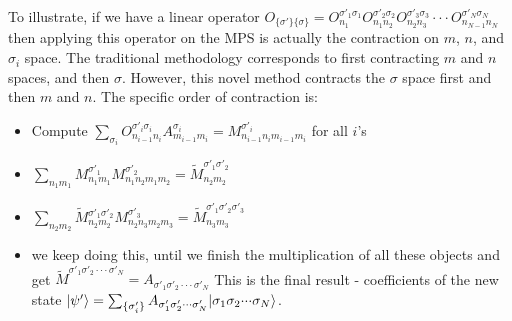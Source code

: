 \documentclass[english]{article}
\begin{document}
To illustrate, if we have a linear operator $O_{\{\sigma'\}\{\sigma\}}=O_{n_{1}}^{\sigma'_{1}\sigma_{1}}O_{n_{1}n_{2}}^{\sigma'_{2}\sigma_{2}}O_{n_{2}n_{3}}^{\sigma'_{3}\sigma_{3}}\cdot\cdot\cdot O_{n_{N-1}n_{N}}^{\sigma'_{N}\sigma_{N}}$
then applying this operator on the MPS is actually the contraction
on $m$, $n$, and $\sigma_{i}$ space. The traditional methodology corresponds
to first contracting $m$ and $n$ spaces, and then $\sigma$. However, this
novel method contracts the $\sigma$ space first and then $m$ and
$n$. The specific order of contraction is:
\begin{itemize}
\item Compute $\sum_{\sigma_{i}}O_{n_{i-1}n_{i}}^{\sigma'_{i}\sigma_{i}}A_{m_{i-1}m_{i}}^{\sigma_{i}}=M_{n_{i-1}n_{i}m_{i-1}m_{i}}^{\sigma'_{i}}$
for all $i$'s
\item $\sum_{n_{1}m_{1}}M_{n_{1}m_{1}}^{\sigma'_{1}}M_{n_{1}n_{2}m_{1}m_{2}}^{\sigma'_{2}}=\tilde{M}_{n_{2}m_{2}}^{\sigma'_{1}\sigma'_{2}}$
\item $\sum_{n_{2}m_{2}}\tilde{M}{}_{n_{2}m_{2}}^{\sigma'_{1}\sigma'_{2}}M_{n_{2}n_{3}m_{2}m_{3}}^{\sigma'_{3}}=\tilde{M}_{n_{3}m_{3}}^{\sigma'_{1}\sigma'_{2}\sigma'_{3}}$
\item we keep doing this, until we finish the multiplication of all these objects
and get $\tilde{M}^{\sigma'_{1}\sigma'_{2}\cdot\cdot\cdot\sigma'_{N}}=A_{\sigma'_{1}\sigma'_{2}\cdot\cdot\cdot\sigma'_{N}}$
This is the final result - coefficients of the new state $|\psi'\rangle=\sum_{\{\sigma'_{i}\}}A_{\sigma'_{1}\sigma'_{2}\cdot\cdot\cdot\sigma'_{N}}|\sigma_{1}\sigma_{2}\text{\ensuremath{\cdot}}\text{\ensuremath{\cdot}}\text{\ensuremath{\cdot}}\sigma_{N}\rangle$.
\end{itemize}
\end{document}
